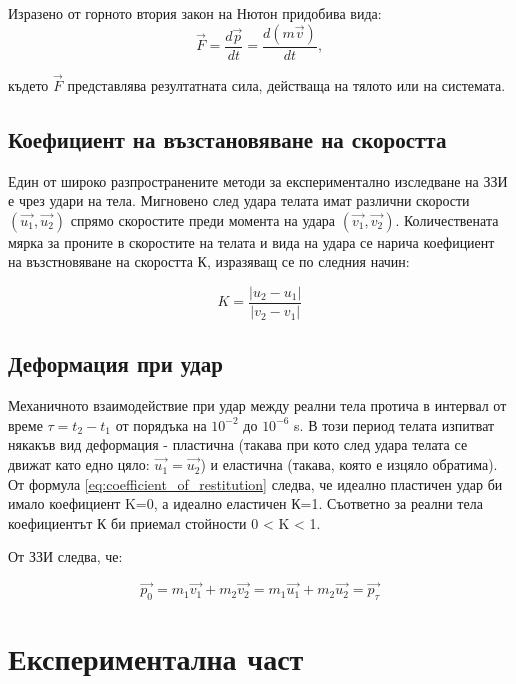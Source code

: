 \documentclass[12pt]{article}
\begin{document}
Изразено от горното втория закон на Нютон придобива вида:
\begin{equation}
    \vec{F} = \frac{d\vec{p}}{dt} = \frac{d(m\vec{v})}{dt},
\end{equation}

където \(\vec{F}\) представлява резултатната сила, действаща на тялото или на системата. 

\subsection{Коефициент на възстановяване на скоростта}\label{sec:coefficient-of-restitution}
Един от широко разпространените методи за експериментално изследване на ЗЗИ е чрез удари на тела. Мигновено след удара телата имат различни скорости \((\vec{u_1}, \vec{u_2})\) спрямо скоростите преди момента на удара \((\vec{v_1}, \vec{v_2})\). Количествената мярка за проните в скоростите на телата и вида на удара се нарича коефициент на възстновяване на скоростта К, изразяващ се по следния начин:

\begin{equation}\label{eq:coefficient_of_restitution}
    K = \frac{|u_2 - u_1|}{|v_2 - v_1|}
\end{equation}


\subsection{Деформация при удар}
Механичното взаимодействие при удар между реални тела протича в интервал от време \(\tau = t_2 - t_1\) от порядъка на \(10^{-2}\) до \(10^{-6}\) s. В този период телата изпитват някакъв вид деформация - пластична (такава при кото след удара телата се движат като едно цяло: \(\vec{u_1} = \vec{u_2}\)) и еластична (такава, която е изцяло обратима). От формула \ref{eq:coefficient_of_restitution} следва, че идеално пластичен удар би имало коефициент K=0, а идеално еластичен К=1. Съответно за реални тела коефициентът К би приемал стойности 0 < K < 1.

От ЗЗИ следва, че:

\begin{equation}
    \vec{p_0} = m_1\vec{v_1} + m_2\vec{v_2} = m_1\vec{u_1} + m_2\vec{u_2} = \vec{p_\tau} 
\end{equation}

\section{Експериментална част}
\end{document}
